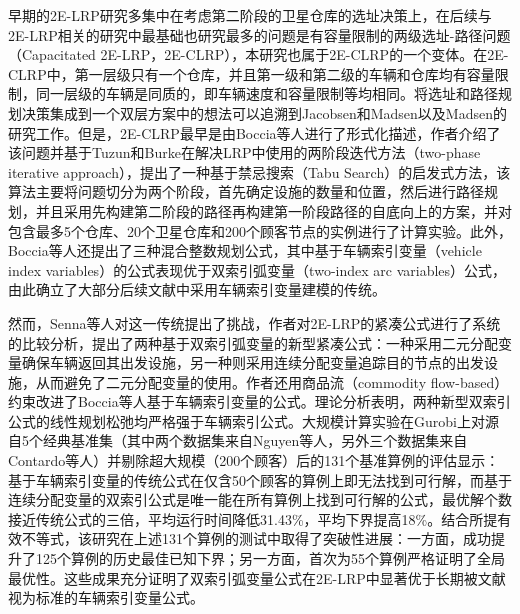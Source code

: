 \documentclass[fontset=none]{ctexart}
\begin{document}
早期的2E-LRP研究多集中在考虑第二阶段的卫星仓库的选址决策上\cite{nguyenSolvingTwoechelonLocation2012, nguyenMultistartIteratedLocal2012}，在后续与2E-LRP相关的研究中最基础也研究最多的问题是有容量限制的两级选址-路径问题（Capacitated 2E-LRP，2E-CLRP）\cite{cudaSurveyTwoechelonRouting2015}，本研究也属于2E-CLRP的一个变体。在2E-CLRP中，第一层级只有一个仓库，并且第一级和第二级的车辆和仓库均有容量限制，同一层级的车辆是同质的，即车辆速度和容量限制等均相同\cite{aliIntegratedSequentialAlgorithms2025}。将选址和路径规划决策集成到一个双层方案中的想法可以追溯到Jacobsen和Madsen\cite{jacobsenComparativeStudyHeuristics1980}以及Madsen的研究工作\cite{madsenMethodsSolvingCombined1983}。但是，2E-CLRP最早是由Boccia等人进行了形式化描述\cite{bocciaMetaheuristicTwoEchelon2010}，作者介绍了该问题并基于Tuzun和Burke在解决LRP中使用的两阶段迭代方法（two-phase iterative approach）\cite{tuzunTwophaseTabuSearch1999}，提出了一种基于禁忌搜索（Tabu Search）的启发式方法，该算法主要将问题切分为两个阶段，首先确定设施的数量和位置，然后进行路径规划，并且采用先构建第二阶段的路径再构建第一阶段路径的自底向上的方案，并对包含最多5个仓库、20个卫星仓库和200个顾客节点的实例进行了计算实验。此外，Boccia等人还提出了三种混合整数规划公式，其中基于车辆索引变量（vehicle index variables）的公式表现优于双索引弧变量（two-index arc variables）公式，由此确立了大部分后续文献中采用车辆索引变量建模的传统\cite{sennaTwoechelonLocationroutingProblem2026}。

然而，Senna等人对这一传统提出了挑战\cite{sennaTwoechelonLocationroutingProblem2026}，作者对2E-LRP的紧凑公式进行了系统的比较分析，提出了两种基于双索引弧变量的新型紧凑公式：一种采用二元分配变量确保车辆返回其出发设施，另一种则采用连续分配变量追踪目的节点的出发设施，从而避免了二元分配变量的使用。作者还用商品流（commodity flow-based）约束改进了Boccia等人\cite{bocciaMetaheuristicTwoEchelon2010}基于车辆索引变量的公式。理论分析表明，两种新型双索引公式的线性规划松弛均严格强于车辆索引公式。大规模计算实验在Gurobi上对源自5个经典基准集（其中两个数据集来自Nguyen等人\cite{nguyenSolvingTwoechelonLocation2012}，另外三个数据集来自Contardo等人\cite{contardoLowerUpperBounds2012}）并剔除超大规模（200个顾客）后的131个基准算例的评估显示：基于车辆索引变量的传统公式在仅含50个顾客的算例上即无法找到可行解，而基于连续分配变量的双索引公式是唯一能在所有算例上找到可行解的公式，最优解个数接近传统公式的三倍，平均运行时间降低31.43\%，平均下界提高18\%。结合所提有效不等式，该研究在上述131个算例的测试中取得了突破性进展：一方面，成功提升了125个算例的历史最佳已知下界；另一方面，首次为55个算例严格证明了全局最优性。这些成果充分证明了双索引弧变量公式在2E-LRP中显著优于长期被文献视为标准的车辆索引变量公式。
\end{document}
